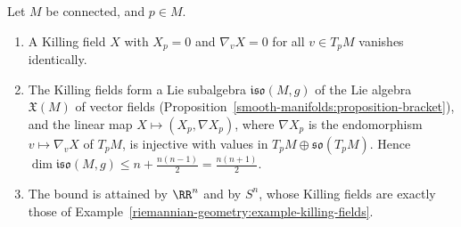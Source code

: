 \begin{theorem}\label{riemannian-geometry:theorem-killing-algebra}
Let $M$ be connected, and $p \in M$.
\begin{enumerate}
\item A Killing field $X$ with $X_p = 0$ and $\nabla_vX = 0$ for all $v \in T_pM$ vanishes identically.
\item The Killing fields form a Lie subalgebra $\mathfrak{iso}(M, g)$ of the Lie algebra $\mathfrak{X}(M)$ of vector fields
(Proposition~\ref{smooth-manifolds:proposition-bracket}), and the linear map $X \mapsto (X_p, \nabla X_p)$, where $\nabla X_p$ is the endomorphism $v \mapsto \nabla_vX$
of $T_pM$, is injective with values in $T_pM \oplus \mathfrak{so}(T_pM)$. Hence $\dim\mathfrak{iso}(M, g) \leq n + \frac{n(n-1)}{2} = \frac{n(n + 1)}{2}$.
\item The bound is attained by $\RR^n$ and by $S^n$, whose Killing fields are exactly those of Example~\ref{riemannian-geometry:example-killing-fields}.
\end{enumerate}
\end{theorem}

